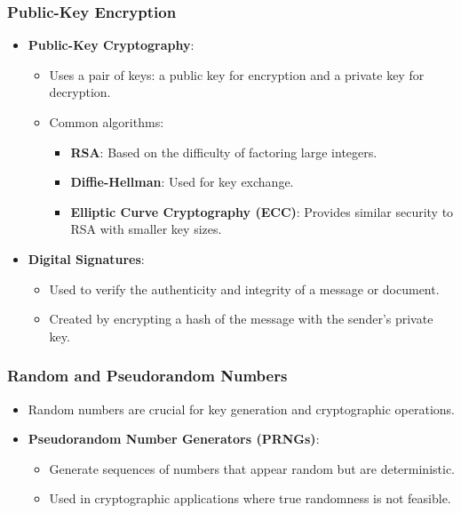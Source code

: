 \documentclass[12pt]{article}
\begin{document}
\subsubsection{Public-Key Encryption}
\begin{itemize}
    \item \textbf{Public-Key Cryptography}:
    \begin{itemize}
        \item Uses a pair of keys: a public key for encryption and a private key for decryption.
        \item Common algorithms:
        \begin{itemize}
            \item \textbf{RSA}: Based on the difficulty of factoring large integers.
            \item \textbf{Diffie-Hellman}: Used for key exchange.
            \item \textbf{Elliptic Curve Cryptography (ECC)}: Provides similar security to RSA with smaller key sizes.
        \end{itemize}
    \end{itemize}
    \item \textbf{Digital Signatures}:
    \begin{itemize}
        \item Used to verify the authenticity and integrity of a message or document.
        \item Created by encrypting a hash of the message with the sender's private key.
    \end{itemize}
\end{itemize}

\subsubsection{Random and Pseudorandom Numbers}
\begin{itemize}
    \item Random numbers are crucial for key generation and cryptographic operations.
    \item \textbf{Pseudorandom Number Generators (PRNGs)}:
    \begin{itemize}
        \item Generate sequences of numbers that appear random but are deterministic.
        \item Used in cryptographic applications where true randomness is not feasible.
    \end{itemize}
\end{itemize}
\end{document}
